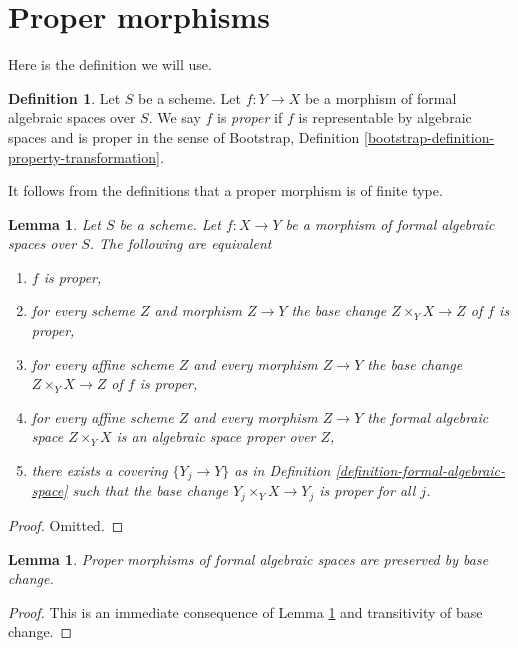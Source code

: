 \documentclass{stacks-project}
\theoremstyle{plain}
\newtheorem{lemma}[subsection]{Lemma}
\theoremstyle{definition}
\newtheorem{definition}[subsection]{Definition}
\theoremstyle{remark}
\numberwithin{equation}{subsection}
\begin{document}
\section{Proper morphisms}
\label{section-proper}

\noindent
Here is the definition we will use.

\begin{definition}
\label{definition-proper}
Let $S$ be a scheme. Let $f : Y \to X$ be a morphism of formal algebraic
spaces over $S$. We say $f$ is {\it proper}
if $f$ is representable by algebraic spaces and is proper in the sense of
Bootstrap, Definition \ref{bootstrap-definition-property-transformation}.
\end{definition}

\noindent
It follows from the definitions that a proper morphism is of finite type.

\begin{lemma}
\label{lemma-proper-local}
Let $S$ be a scheme. Let $f : X \to Y$ be a morphism of formal algebraic spaces
over $S$. The following are equivalent
\begin{enumerate}
\item $f$ is proper,
\item for every scheme $Z$ and morphism $Z \to Y$ the
base change $Z \times_Y X \to Z$ of $f$ is proper,
\item for every affine scheme $Z$ and every morphism $Z \to Y$ the
base change $Z \times_Y X \to Z$ of $f$ is proper,
\item for every affine scheme $Z$ and every morphism $Z \to Y$ the
formal algebraic space $Z \times_Y X$ is an algebraic space proper over $Z$,
\item there exists a covering $\{Y_j \to Y\}$ as in
Definition \ref{definition-formal-algebraic-space}
such that the base change $Y_j \times_Y X \to Y_j$ is proper for all $j$.
\end{enumerate}
\end{lemma}

\begin{proof}
Omitted.
\end{proof}

\begin{lemma}
\label{lemma-base-change-proper}
Proper morphisms of formal algebraic spaces are preserved by base change.
\end{lemma}

\begin{proof}
This is an immediate consequence of Lemma \ref{lemma-proper-local}
and transitivity of base change.
\end{proof}
\end{document}
